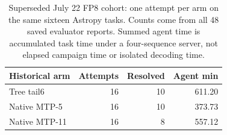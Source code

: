 \begin{table}[t]
\caption{Superseded July 22 FP8 cohort: one attempt per arm on the same sixteen Astropy tasks. Counts come from all 48 saved evaluator reports. Summed agent time is accumulated task time under a four-sequence server, not elapsed campaign time or isolated decoding time.}
\label{tab:historical-fp8}
\centering\small
\begin{tabular}{@{}lrrr@{}}
\toprule
Historical arm & Attempts & Resolved & Agent min \\
\midrule
Tree tail6 & 16 & 10 & 611.20 \\
Native MTP-5 & 16 & 10 & 373.73 \\
Native MTP-11 & 16 & 8 & 557.12 \\
\bottomrule
\end{tabular}
\end{table}
